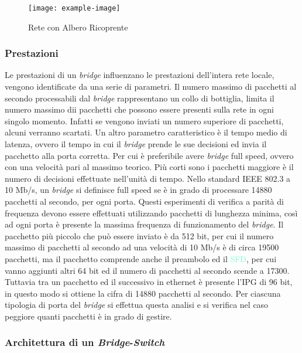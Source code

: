 \documentclass{article}
\numberwithin{equation}{subsection}
\begin{document}
\begin{figure}[H]%
    \centering%
    \texttt{[image: example-image]}%
    \caption{Rete con Albero Ricoprente}%
\end{figure}

\subsubsection{Prestazioni}

Le prestazioni di un \textit{bridge} influenzano le prestazioni dell'intera rete locale, vengono identificate da una serie di parametri. Il numero massimo di pacchetti al 
secondo processabili dal \textit{bridge} rappresentano un collo di bottiglia, limita il numero massimo dii pacchetti che possono essere presenti sulla rete in ogni singolo momento. Infatti se vengono 
inviati un numero superiore di pacchetti, alcuni verranno scartati. Un altro parametro caratteristico è il tempo medio di latenza, ovvero il tempo in cui il 
\textit{bridge} prende le sue decisioni ed invia il pacchetto alla porta corretta. 
Per cui è preferibile avere \textit{bridge} full speed, ovvero con una velocità pari al massimo teorico. Più corti sono i pacchetti maggiore è il numero di decisioni 
effettuate nell'unità di tempo. Nello standard IEEE 802.3 a 10 Mb/s, un \textit{bridge} si definisce full speed se è in grado di processare 14880 pacchetti al secondo, 
per ogni porta. Questi esperimenti di verifica a parità di frequenza devono essere effettuati utilizzando pacchetti di lunghezza minima, così ad ogni porta è presente 
la massima frequenza di funzionamento del \textit{bridge}. 
Il pacchetto più piccolo che può essere inviato è da 512 bit, per cui il numero massimo di pacchetti al secondo ad una 
velocità di 10 Mb/s è di circa 19500 pacchetti, ma il pacchetto comprende anche il preambolo ed il \textcolor{Aquamarine}{SFD}, per cui vanno aggiunti altri 64 bit ed il 
numero di pacchetti al secondo scende a 17300. 
Tuttavia tra un pacchetto ed il successivo in ethernet è presente l'IPG di 96 bit, in questo modo si ottiene la cifra di 14880 pacchetti al secondo. 
Per ciascuna tipologia di porta del \textit{bridge} si effettua questa analisi e si verifica nel caso peggiore quanti pacchetti è in grado di gestire. 

\subsubsection{Architettura di un \textit{Bridge}-\textit{Switch}}
\end{document}
